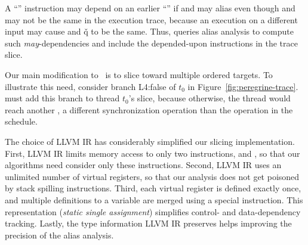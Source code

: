 A ``'' instruction may depend on an earlier ``'' if
 and  may alias even though  and  may not be the
same in the execution trace, because an execution on a different input
may cause  and \v{q} to be the same.  Thus, \peregrine queries alias
analysis to compute such \emph{may}-dependencies and include the depended-upon
instructions in the trace slice.

Our main modification to~\cite{castro:bouncer} is to slice toward multiple
ordered targets.  To illustrate this need, consider branch L4:false of
$t_0$ in Figure~\ref{fig:peregrine-trace}.  \peregrine must add this branch  to thread
$t_0$'s slice, because otherwise, the thread would reach another
, a different synchronization operation than the
 operation in the schedule.


The choice of LLVM IR has considerably simplified our slicing
implementation.  First, LLVM IR limits memory access to only two
instructions,  and , so that our
algorithms need consider only these
instructions.  Second, LLVM IR uses an unlimited number of virtual registers,
so that our analysis does not get poisoned by stack spilling instructions.
Third, each virtual register is defined exactly once, and multiple
definitions to a variable are merged using a special instruction.  This
representation (\emph{static single assignment}) simplifies
control- and data-dependency tracking.  Lastly, the type information LLVM IR
preserves helps improving the precision of the alias analysis.

